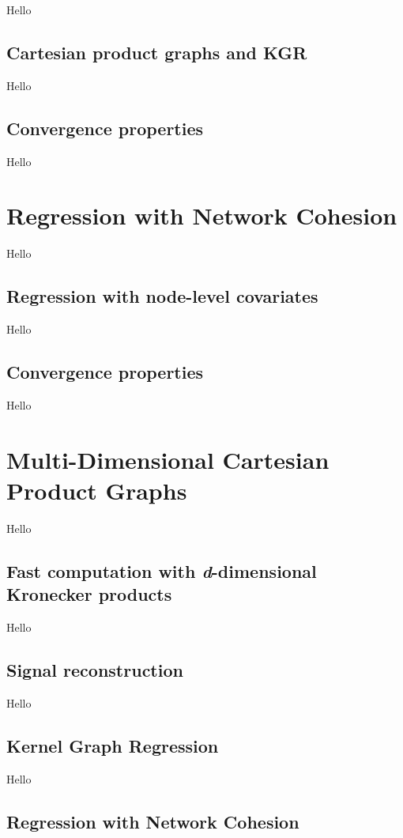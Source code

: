 \label{sec:kgr_mdp}

Hello

\subsection{Cartesian product graphs and KGR}

Hello

\subsection{Convergence properties}

Hello


\section{Regression with Network Cohesion}

\label{sec:rnc_mdp}

Hello

\subsection{Regression with node-level covariates}

Hello

\subsection{Convergence properties}

Hello


\section{Multi-Dimensional Cartesian Product Graphs}

\label{sec:nd_gsp}

Hello

\subsection{Fast computation with \textit{d}-dimensional Kronecker products}

Hello

\subsection{Signal reconstruction}

Hello

\subsection{Kernel Graph Regression}

Hello

\subsection{Regression with Network Cohesion}


